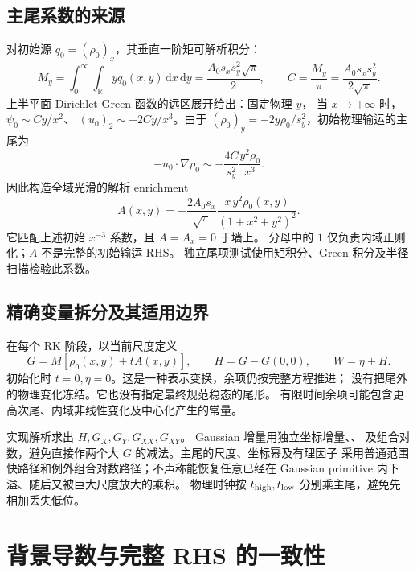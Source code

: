\documentclass[UTF8,fontset=fandol,11pt,a4paper]{ctexart}
\newcommand{\code}[1]{\texttt{\detokenize{#1}}}
\newcommand{\dd}{\,\mathrm d}
\newcommand{\R}{\mathbb R}
\begin{document}
\subsection{主尾系数的来源}
对初始源 $q_0=(\rho_0)_x$，其垂直一阶矩可解析积分：
\begin{equation}
 M_y=\int_0^\infty\!\int_{\R}yq_0(x,y)\dd x\dd y
     =\frac{A_0s_xs_y^2\sqrt\pi}{2},\qquad
 C=\frac{M_y}{\pi}=\frac{A_0s_xs_y^2}{2\sqrt\pi}.
\end{equation}
上半平面 Dirichlet Green 函数的远区展开给出：固定物理 $y$，
当 $x\to+\infty$ 时，$\psi_0\sim Cy/x^2$、
$(u_0)_2\sim-2Cy/x^3$。由于
$(\rho_0)_y=-2y\rho_0/s_y^2$，初始物理输运的主尾为
\[
 -u_0\cdot\nabla\rho_0
 \sim-\frac{4C}{s_y^2}\frac{y^2\rho_0}{x^3}.
\]
因此构造全域光滑的解析 enrichment
\begin{equation}
 A(x,y)=-\frac{2A_0s_x}{\sqrt\pi}
       \frac{x\,y^2\rho_0(x,y)}{(1+x^2+y^2)^2}.
 \label{eq:tail}
\end{equation}
它匹配上述初始 $x^{-3}$ 系数，且 $A=A_x=0$ 于墙上。
分母中的 $1$ 仅负责内域正则化；$A$ 不是完整的初始输运 RHS。
独立尾项测试使用矩积分、Green 积分及半径扫描检验此系数。

\subsection{精确变量拆分及其适用边界}
在每个 RK 阶段，以当前尺度定义
\begin{equation}
 G=M[\rho_0(x,y)+tA(x,y)],\qquad
 H=G-G(0,0),\qquad W=\eta+H.
 \label{eq:background}
\end{equation}
初始化时 $t=0,\eta=0$。这是一种表示变换，余项仍按完整方程推进；
没有把尾外的物理变化冻结。它也没有指定最终规范稳态的尾形。
有限时间余项可能包含更高次尾、内域非线性变化及中心化产生的常量。

实现解析求出 $H,G_X,G_Y,G_{XX},G_{XY}$。
Gaussian 增量用独立坐标增量、\code{expm1}、\code{erfcx}
及组合对数，避免直接作两个大 $G$ 的减法。主尾的尺度、坐标幂及有理因子
采用普通范围快路径和例外组合对数路径；不声称能恢复任意已经在 Gaussian
primitive 内下溢、随后又被巨大尺度放大的乘积。
物理时钟按 $t_{\rm high},t_{\rm low}$ 分别乘主尾，避免先相加丢失低位。

\clearpage
\section{背景导数与完整 RHS 的一致性}
\end{document}
